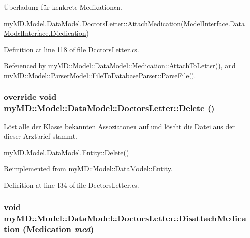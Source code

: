 \"{U}berladung f\"{u}r konkrete Medikationen. 

\hyperlink{classmy_m_d_1_1_model_1_1_data_model_1_1_doctors_letter_c6c9d35845c1c0e4c389656215df6e2e}{my\-MD.Model.Data\-Model.Doctors\-Letter::Attach\-Medication}(\hyperlink{interfacemy_m_d_1_1_model_interface_1_1_data_model_interface_1_1_i_medication}{Model\-Interface.Data\-Model\-Interface.IMedication}) 

Definition at line 118 of file Doctors\-Letter.cs.

Referenced by my\-MD::Model::Data\-Model::Medication::Attach\-To\-Letter(), and my\-MD::Model::Parser\-Model::File\-To\-Database\-Parser::Parse\-File().\hypertarget{classmy_m_d_1_1_model_1_1_data_model_1_1_doctors_letter_51a833214dab53bfafb630573fc0fe77}{
\subsubsection[Delete]{\setlength{\rightskip}{0pt plus 5cm}override void my\-MD::Model::Data\-Model::Doctors\-Letter::Delete ()}}
\label{dc/d86/classmy_m_d_1_1_model_1_1_data_model_1_1_doctors_letter_51a833214dab53bfafb630573fc0fe77}


L\"{o}st alle der Klasse bekannten Assoziatonen auf und l\"{o}scht die Datei aus der dieser Arztbrief stammt. 

\hyperlink{classmy_m_d_1_1_model_1_1_data_model_1_1_entity_51a833214dab53bfafb630573fc0fe77}{my\-MD.Model.Data\-Model.Entity::Delete()} 

Reimplemented from \hyperlink{classmy_m_d_1_1_model_1_1_data_model_1_1_entity_51a833214dab53bfafb630573fc0fe77}{my\-MD::Model::Data\-Model::Entity}.

Definition at line 134 of file Doctors\-Letter.cs.\hypertarget{classmy_m_d_1_1_model_1_1_data_model_1_1_doctors_letter_054bedc79ee2e214b176609861b0f663}{
\subsubsection[DisattachMedication]{\setlength{\rightskip}{0pt plus 5cm}void my\-MD::Model::Data\-Model::Doctors\-Letter::Disattach\-Medication (\hyperlink{classmy_m_d_1_1_model_1_1_data_model_1_1_medication}{Medication} {\em med})}}
\label{dc/d86/classmy_m_d_1_1_model_1_1_data_model_1_1_doctors_letter_054bedc79ee2e214b176609861b0f663}



